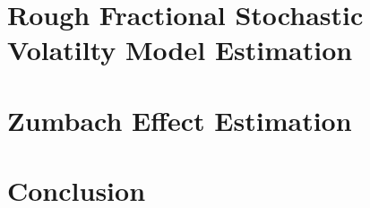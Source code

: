 


    \begin{titlepage}
        \maketitle

        \begin{abstract}
            
        \end{abstract}
    \end{titlepage}

    

    \chapter{Rough Fractional Stochastic Volatilty Model Estimation}

        

        

    \chapter{Zumbach Effect Estimation}

    \chapter{Conclusion}

    

    \printbibliography[heading=bibintoc]

    
    
